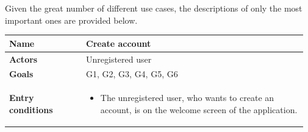 
Given the great number of different use cases, the descriptions of only the most important ones are provided below.

\begin{table}[H]
	\begin{tabular}{@{}p{0.25\linewidth} p{0.72\linewidth}@{}}
		\toprule
		\textbf{Name}               & Create account \\
		\midrule
		\textbf{Actors}             & Unregistered user \\
		\midrule
		\textbf{Goals}              & G1, G2, G3, G4, G5, G6 \\
		\midrule
		
		\textbf{Entry conditions}   & \begin{itemize}[leftmargin=.4cm,noitemsep,topsep=0pt,before=\vspace{-3mm},after=\vspace{-4mm}]
		    \item The unregistered user, who wants to create an account, is  on the welcome screen of the application.
		\end{itemize}\\
		\midrule
		

\end{tabular}
\end{table}
